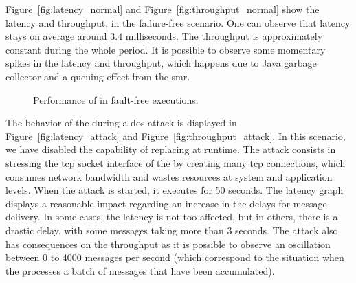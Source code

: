 Figure~\ref{fig:latency_normal} and Figure~\ref{fig:throughput_normal} show the latency and throughput, in the failure-free scenario.
One can observe that latency stays on average around $3.4$ milliseconds.
The throughput is approximately constant during the whole period.
It is possible to observe some momentary spikes in the latency and throughput, which happens due to Java garbage collector and a queuing effect from the \gls{smr}.

\begin{figure}[h]

\hspace{-5mm}
\caption{Performance of \sieveq in fault-free executions.}
\label{fig:performance_attacks}
\end{figure}




The behavior of the \sieveq during a \gls{dos} attack is displayed in Figure~\ref{fig:latency_attack} and Figure~\ref{fig:throughput_attack}.
In this scenario, we have disabled the \sieveq capability of replacing \presieves at runtime.
The attack consists in stressing the \gls{tcp} socket interface of the \presieves by creating many \gls{tcp} connections, which consumes network bandwidth and wastes resources at system and application levels. When the attack is started, it executes for 50 seconds. The latency graph displays a reasonable impact regarding an increase in the delays for message delivery. 
In some cases, the latency is not too affected, but in others, there is a drastic delay, with some messages taking more than 3 seconds.
The attack also has consequences on the throughput as it is possible to observe an oscillation between 0 to 4000 messages per second (which correspond to the situation when the \postsieve processes a batch of messages that have been accumulated).


